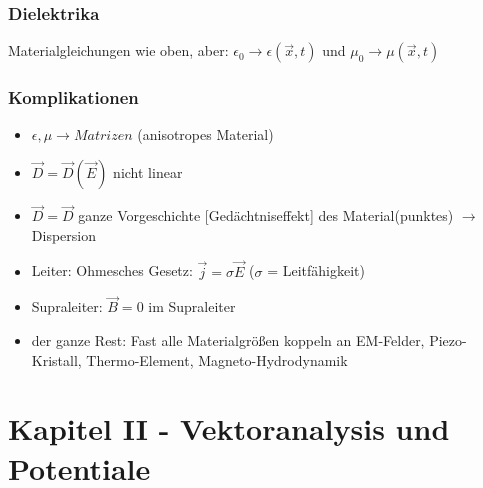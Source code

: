\documentclass{article}
\begin{document}
\subsubsection{Dielektrika}
Materialgleichungen wie oben, aber: $\epsilon_0 \rightarrow \epsilon(\vec x, t)$ und $\mu_0 \rightarrow \mu(\vec x, t)$\\
\subsubsection{Komplikationen}
\begin{itemize}
\item $\epsilon, \mu \rightarrow Matrizen$ (anisotropes Material)
\item $\vec D = \vec D(\vec E)$ nicht linear
\item $\vec D = \vec D$ ganze Vorgeschichte [Gedächtniseffekt] des Material(punktes) $\rightarrow$ Dispersion
\item Leiter: Ohmesches Gesetz: $\vec j = \sigma \vec E$ ($\sigma$ = Leitfähigkeit)
\item Supraleiter: $\vec B = 0$ im Supraleiter
\item der ganze Rest: Fast alle Materialgrößen koppeln an EM-Felder, Piezo-Kristall, Thermo-Element, Magneto-Hydrodynamik
\end{itemize}


\section{Kapitel II - Vektoranalysis und Potentiale}
\end{document}

